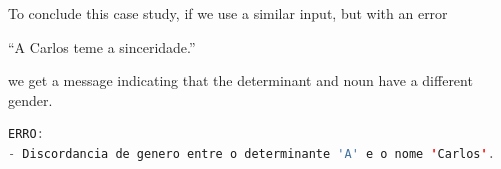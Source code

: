 %
%
%
%


To conclude this case study, if we use a similar input, but with an error

``A Carlos teme a sinceridade.''

\noindent we get a message indicating that the determinant and noun have a different gender.

\begin{center}
\begin{minipage}{12cm}
\begin{lstlisting}[language=java, basicstyle=\small, label={lst:erro_gender_dsl_excerpt}, caption=Example of a gender error message]
ERRO:
- Discordancia de genero entre o determinante 'A' e o nome 'Carlos'.
\end{lstlisting}
\end{minipage}
\end{center}

